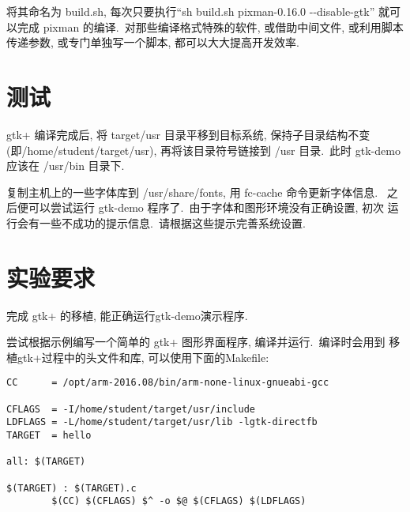 将其命名为 build.sh, 每次只要执行``sh build.sh pixman-0.16.0 -{}-disable-gtk''
就可以完成 pixman 的编译.~对那些编译格式特殊的软件, 或借助中间文件, 或利用脚本
传递参数, 或专门单独写一个脚本, 都可以大大提高开发效率.

\section{测试}
    gtk+ 编译完成后, 将 target/usr 目录平移到目标系统, 保持子目录结构不变
(即/home/student/target/usr), 再将该目录符号链接到 /usr 目录.~此时 gtk-demo
应该在 /usr/bin 目录下.

    复制主机上的一些字体库到 /usr/share/fonts, 用 fc-cache 命令更新字体信息.
~之后便可以尝试运行 gtk-demo 程序了.~由于字体和图形环境没有正确设置, 初次
运行会有一些不成功的提示信息.~请根据这些提示完善系统设置.

\section{实验要求}
    完成 gtk+ 的移植, 能正确运行gtk-demo演示程序.

    尝试根据示例编写一个简单的 gtk+ 图形界面程序, 编译并运行.~编译时会用到
移植gtk+过程中的头文件和库, 可以使用下面的Makefile:

\lstset{language=make}
\begin{lstlisting}[frame=trBL]
CC      = /opt/arm-2016.08/bin/arm-none-linux-gnueabi-gcc

CFLAGS  = -I/home/student/target/usr/include
LDFLAGS = -L/home/student/target/usr/lib -lgtk-directfb
TARGET  = hello

all: $(TARGET)

$(TARGET) : $(TARGET).c
        $(CC) $(CFLAGS) $^ -o $@ $(CFLAGS) $(LDFLAGS)

\end{lstlisting}
